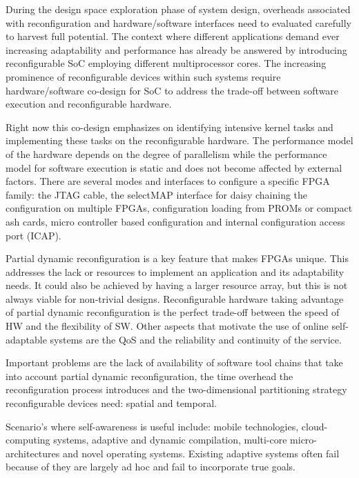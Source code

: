 
During the design space exploration phase of system design, overheads associated with reconfiguration and hardware/software interfaces need to evaluated carefully to harvest full potential. The context where different applications demand ever increasing adaptability and performance has already be answered by introducing reconfigurable SoC employing different multiprocessor cores. The increasing prominence of reconfigurable devices within such systems require hardware/software co-design for SoC to address the trade-off between software execution and reconfigurable hardware.

Right now this co-design emphasizes on identifying intensive kernel tasks and implementing these tasks on the reconfigurable hardware. The performance model of the hardware depends on the degree of parallelism while the performance model for software execution is static and does not become affected by external factors.
There are several modes and interfaces to configure a specific FPGA family: the JTAG cable, the selectMAP interface for daisy chaining the configuration on multiple FPGAs, configuration loading from PROMs or compact ash cards, micro controller based configuration and internal configuration access port (ICAP).

Partial dynamic reconfiguration is a key feature that makes FPGAs unique. This addresses the lack or resources to implement an application and its adaptability needs. It could also be achieved by having a larger resource array, but this is not always viable for non-trivial designs. Reconfigurable hardware taking advantage of partial dynamic reconfiguration is the perfect trade-off between the speed of HW and the flexibility of SW. Other aspects that motivate the use of online self-adaptable systems are the QoS and the reliability and continuity of the service.

Important problems are the lack of availability of software tool chains that take into account partial dynamic reconfiguration, the time overhead the reconfiguration process introduces and the two-dimensional partitioning strategy reconfigurable devices need: spatial and temporal.

Scenario's where self-awareness is useful include: mobile technologies, cloud-computing systems, adaptive and dynamic compilation, multi-core micro-architectures and novel operating systems. Existing adaptive systems often fail because of they are largely ad hoc and fail to incorporate true goals.

